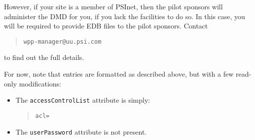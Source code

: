 However,
if your site is a member of PSInet,
then the pilot sponsors will administer the DMD for you,
if you lack the facilities to do so.
In this case,
you will be required to provide EDB files to the pilot sponsors.
Contact 
\begin{quote}\small\begin{verbatim}
wpp-manager@uu.psi.com
\end{verbatim}\end{quote}
to find out the full details.

For now, 
note that entries are formatted as described above,
but with a few read-only modifications:
\begin{itemize}
\item	The \verb"accessControlList" attribute is simply:
\begin{quote}\small\begin{verbatim}
acl=
\end{verbatim}\end{quote}

\item	The \verb"userPassword" attribute is not present.
\end{itemize}

